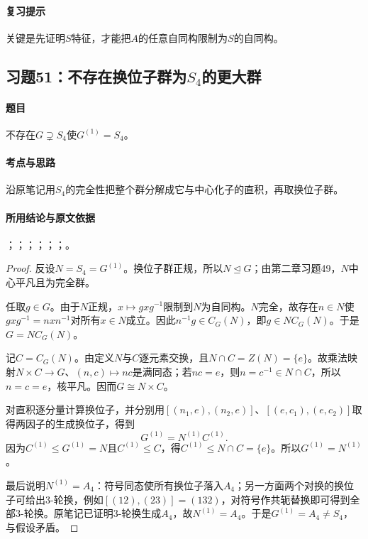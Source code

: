 \paragraph{复习提示}
关键是先证明$S$特征，才能把$A$的任意自同构限制为$S$的自同构。


\subsection{习题51：\texorpdfstring{不存在换位子群为$S_4$的更大群}{不存在换位子群为S4的更大群}}
\label{ex:2:51}

\paragraph{题目}
不存在$G\supsetneq S_4$使$G^{(1)}=S_4$。

\paragraph{考点与思路}
沿原笔记用$S_4$的完全性把整个群分解成它与中心化子的直积，再取换位子群。

\paragraph{所用结论与原文依据}
；；；；；；。


\begin{proof}
反设$N=S_4=G^{(1)}$。换位子群正规，所以$N\trianglelefteq G$；由第二章习题49，$N$中心平凡且为完全群。

任取$g\in G$。由于$N$正规，$x\mapsto gxg^{-1}$限制到$N$为自同构。$N$完全，故存在$n\in N$使$gxg^{-1}=nxn^{-1}$对所有$x\in N$成立。因此$n^{-1}g\in C_G(N)$，即$g\in NC_G(N)$。于是$G=NC_G(N)$。

记$C=C_G(N)$。由定义$N$与$C$逐元素交换，且$N\cap C=Z(N)=\{e\}$。故乘法映射$N\times C\to G$、$(n,c)\mapsto nc$是满同态；若$nc=e$，则$n=c^{-1}\in N\cap C$，所以$n=c=e$，核平凡。因而$G\cong N\times C$。

对直积逐分量计算换位子，并分别用$[(n_1,e),(n_2,e)]$、$[(e,c_1),(e,c_2)]$取得两因子的生成换位子，得到
\[
G^{(1)}=N^{(1)}C^{(1)}.
\]
因为$C^{(1)}\leq G^{(1)}=N$且$C^{(1)}\leq C$，得$C^{(1)}\leq N\cap C=\{e\}$。所以$G^{(1)}=N^{(1)}$。

最后说明$N^{(1)}=A_4$：符号同态使所有换位子落入$A_4$；另一方面两个对换的换位子可给出3-轮换，例如$[(12),(23)]=(132)$，对符号作共轭替换即可得到全部3-轮换。原笔记已证明3-轮换生成$A_4$，故$N^{(1)}=A_4$。于是$G^{(1)}=A_4\ne S_4$，与假设矛盾。
\end{proof}

